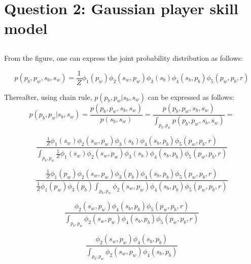 \documentclass[a4paper,11pt]{article}
\theoremstyle{mytheor}
\begin{document}
\subsection{}


\section{Question 2: Gaussian player skill model}
\subsection{}
From the figure, one can express the joint probability distribution as follows:

\begin{equation}
    \label{eq:joint_distr}
    p(p_b,p_w,s_b,s_w) = \frac{1}{Z}\phi_{1}(p_w)\phi_{2}(s_w,p_w)\phi_{3}(s_b)\phi_{4}(s_b,p_b)\phi_{5}(p_w,p_b,r)
\end{equation}

Thereafter, using chain rule, $p(p_b,p_w|s_b,s_w)$ can be expressed as follows:
\begin{equation}
    \label{eq:chain_rule}
    p(p_b,p_w|s_b,s_w) = \frac{p(p_b,p_w,s_b,s_w)}{p(s_b,s_w)} = \frac{p(p_b,p_w,s_b,s_w)}{\int_{p_b,p_w} p(p_b,p_w,s_b,s_w)}= 
\end{equation}

\begin{equation}
    \label{eq:chain_rule_1}
    \frac{\frac{1}{Z}\phi_{1}(s_w)\phi_{2}(s_w,p_w)\phi_{3}(s_b)\phi_{4}(s_b,p_b)\phi_{5}(p_w,p_b,r)}{\int_{p_b,p_w}\frac{1}{Z}\phi_{1}(s_w)\phi_{2}(s_w,p_w)\phi_{3}(s_b)\phi_{4}(s_b,p_b)\phi_{5}(p_w,p_b,r)}
\end{equation}

\begin{equation}
    \label{eq:chain_rule_2}
    \frac{\frac{1}{Z}\phi_{1}(p_w)\phi_{2}(s_w,p_w)\phi_{3}(p_b)\phi_{4}(s_b,p_b)\phi_{5}(p_w,p_b,r)}{\frac{1}{Z}\phi_{1}(p_w)\phi_{3}(p_b)\int_{p_b,p_w}\phi_{2}(s_w,p_w)\phi_{4}(s_b,p_b)\phi_{5}(p_w,p_b,r)}
\end{equation}

\begin{equation}
    \label{eq:chain_rule_3}
    \frac{\phi_{2}(s_w,p_w)\phi_{4}(s_b,p_b)\phi_{5}(p_w,p_b,r)}{\int_{p_b,p_w}\phi_{2}(s_w,p_w)\phi_{4}(s_b,p_b)\phi_{5}(p_w,p_b,r)}
\end{equation}

\begin{equation}
    \label{eq:chain_rule_4}
    \frac{\phi_{2}(s_w,p_w)\phi_{4}(s_b,p_b)}{\int_{p_b,p_w}\phi_{2}(s_w,p_w)\phi_{4}(s_b,p_b)}
\end{equation}
\end{document}
